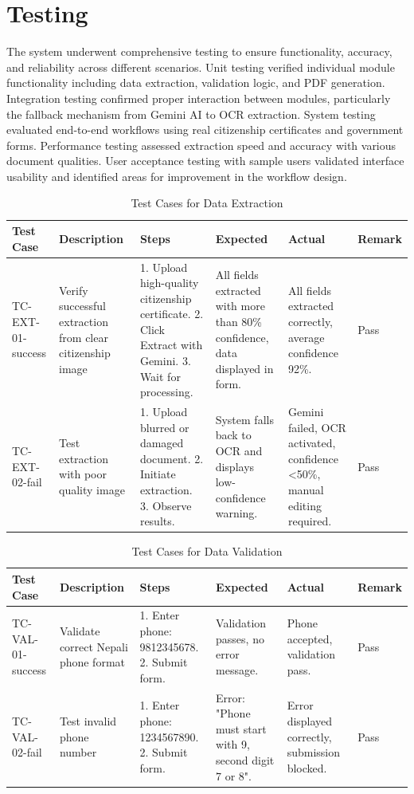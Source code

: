 \documentclass[12pt]{report}
\begin{document}
\section{Testing}
The system underwent comprehensive testing to ensure functionality, accuracy, and reliability across different scenarios. Unit testing verified individual module functionality including data extraction, validation logic, and PDF generation. Integration testing confirmed proper interaction between modules, particularly the fallback mechanism from Gemini AI to OCR extraction. System testing evaluated end-to-end workflows using real citizenship certificates and government forms. Performance testing assessed extraction speed and accuracy with various document qualities. User acceptance testing with sample users validated interface usability and identified areas for improvement in the workflow design.
\begin{table}[H]
\centering
\caption{Test Cases for Data Extraction}
\label{tab:test_extraction}
\begin{tabular}{|p{1.5cm}|p{2.8cm}|p{3cm}|p{3cm}|p{2.8cm}|p{1.4cm}|}
\hline
\textbf{Test Case} & \textbf{Description} & \textbf{Steps} & \textbf{Expected} & \textbf{Actual} & \textbf{Remark} \\
\hline
TC-EXT-01-success & 
Verify successful extraction from clear citizenship image &
1. Upload high-quality citizenship certificate.
2. Click Extract with Gemini. 
3. Wait for processing. &
All fields extracted with more than 80\% confidence, data displayed in form. &
All fields extracted correctly, average confidence 92\%. &
Pass \\
\hline
TC-EXT-02-fail &
Test extraction with poor quality image &
1. Upload blurred or damaged document.
2. Initiate extraction.
3. Observe results. &
System falls back to OCR and displays low-confidence warning. &
Gemini failed, OCR activated, confidence <50\%, manual editing required. &
Pass \\
\hline
\end{tabular}
\end{table}

\begin{table}[H]
\centering
\caption{Test Cases for Data Validation}
\label{tab:test_validation}
\begin{tabular}{|p{1.5cm}|p{2.8cm}|p{3cm}|p{3cm}|p{2.8cm}|p{1.4cm}|}
\hline
\textbf{Test Case} & \textbf{Description} & \textbf{Steps} & \textbf{Expected} & \textbf{Actual} & \textbf{Remark} \\
\hline
TC-VAL-01-success & 
Validate correct Nepali phone format &
1. Enter phone: 9812345678.
2. Submit form. &
Validation passes, no error message. &
Phone accepted, validation pass. &
Pass \\
\hline
TC-VAL-02-fail &
Test invalid phone number &
1. Enter phone: 1234567890.
2. Submit form. &
Error: "Phone must start with 9, second digit 7 or 8". &
Error displayed correctly, submission blocked. &
Pass \\
\hline
\end{tabular}
\end{table}
\end{document}
